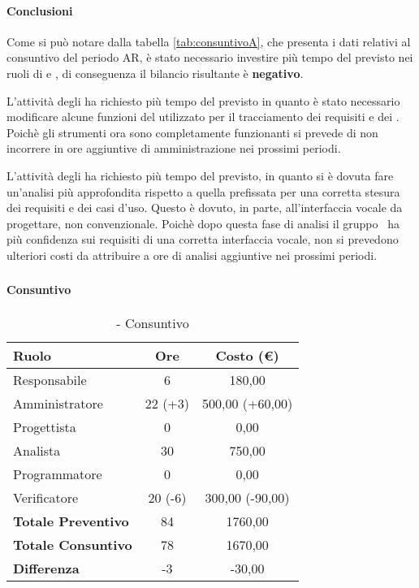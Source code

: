 \documentclass[./PianoDiProgetto.tex]{subfiles}
\begin{document}
  \paragraph{Conclusioni}
		Come si può notare dalla tabella \ref{tab:consuntivoA}, che presenta i dati relativi al consuntivo del periodo AR, è stato necessario investire più tempo del previsto nei ruoli di  \AMM{} e \AN, di conseguenza il bilancio risultante è \textbf{negativo}.
		
		L'attività degli \AMMP{} ha richiesto più tempo del previsto in quanto è stato necessario modificare alcune funzioni del  utilizzato per il tracciamento dei requisiti e dei . Poichè gli strumenti ora sono completamente funzionanti si prevede di non incorrere in ore aggiuntive di amministrazione nei prossimi periodi.
		
		L'attività degli \ANP{} ha richiesto più tempo del previsto, in quanto si è dovuta fare un'analisi più approfondita rispetto a quella prefissata per una corretta stesura dei requisiti e dei casi d'uso.
		Questo è dovuto, in parte, all'interfaccia vocale da progettare, non convenzionale.
		Poichè dopo questa fase di analisi il gruppo \GRUPPO\ ha più confidenza sui requisiti di una corretta interfaccia vocale, non si prevedono ulteriori costi da attribuire a ore di analisi aggiuntive nei prossimi periodi.

\subsubsection{\PerAD}
	\paragraph{Consuntivo}
	\begin{table}[h]
		\centering
		\begin{tabular}{l * {2}{c}}
			\toprule
			\textbf{Ruolo} & \textbf{Ore} & \textbf{Costo (\euro{})} \\
			\midrule
			Responsabile &	6 & 180,00 \\
			Amministratore & 22 (+3)  & 500,00 (+60,00)\\
			Progettista & 0 & 0,00 \\
			Analista & 30 & 750,00\\
			Programmatore & 0 & 0,00 \\
			Verificatore & 20 (-6) & 300,00 (-90,00)\\
			\midrule
			\textbf{Totale Preventivo} & 84
 & 1760,00
 \\		
			\textbf{Totale Consuntivo} & 78 & 1670,00
 \\
			\midrule
			\textbf{Differenza} & -3 & -30,00 \\
			\bottomrule
		\end{tabular}
		\caption{\PerAD{} - Consuntivo}
		
	\end{table}	
\end{document}
